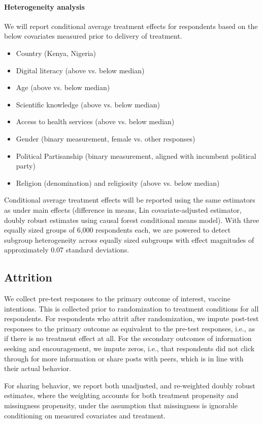 \documentclass[letterpaper, 12pt, parskip=full,DIV=10]{scrartcl}
\begin{document}
\paragraph{Heterogeneity analysis}
We will report conditional average treatment effects for respondents based on the below covariates measured prior to delivery of treatment. 
\begin{itemize}
\item Country (Kenya, Nigeria)
\item Digital literacy (above vs. below median)
\item Age (above vs. below median)
\item Scientific knowledge (above vs. below median)
\item Access to health services (above vs. below median)
\item Gender (binary measurement, female vs. other responses)
\item Political Partisanship (binary measurement, aligned with incumbent political party)
\item Religion (denomination) and religiosity (above vs. below median)
\end{itemize}

Conditional average treatment effects will be reported using the same estimators as under main effects (difference in means, Lin covariate-adjusted estimator, doubly robust estimates using causal forest conditional means model). With three equally sized groups of 6,000 respondents each, we are powered to detect subgroup heterogeneity across equally sized subgroups with effect magnitudes of approximately 0.07 standard deviations. 

\subsection{Attrition}
We collect pre-test responses to the primary outcome of interest, vaccine intentions. This is collected prior to randomization to treatment conditions for all respondents. For respondents who attrit after randomization, we impute post-test responses to the primary outcome as equivalent to the pre-test responses, i.e., as if there is no treatment effect at all. For the secondary outcomes of information seeking and encouragement, we impute zeros, i.e., that respondents did not click through for more information or share posts with peers, which is in line with their actual behavior. 

For sharing behavior, we report both unadjusted, and re-weighted doubly robust estimates, where the weighting accounts for both treatment propensity and missingness propensity, under the assumption that missingness is ignorable conditioning on measured covariates and treatment. 
\end{document}
